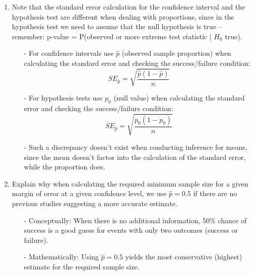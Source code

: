 \documentclass[11pt]{article}
\begin{document}
\begin{enumerate}
\item Note that the standard error calculation for the confidence interval and the hypothesis test are different when dealing with proportions, since in the hypothesis test we need to assume that the null hypothesis is true -- remember: p-value = P(observed or more extreme test statistic $|$ $H_0$ true).
\begin{itemize}
\item[-] For confidence intervals use $\hat{p}$ (observed sample proportion) when calculating the standard error and checking the success/failure condition:
\[ SE_{\hat{p}} = \sqrt{\frac{\hat{p}(1-\hat{p})}{n}} \]
\item[-] For hypothesis tests use $p_0$ (null value) when calculating the standard error and checking the success/failure condition:
\[ SE_{\hat{p}} = \sqrt{\frac{p_0 (1-p_0)}{n}} \]
\item[-] Such a discrepancy doesn't exist when conducting inference for means, since the mean doesn't factor into the calculation of the standard error, while the proportion does.
\end{itemize}

\item Explain why when calculating the required minimum sample size for a given margin of error at a given confidence level, we use $\hat{p} = 0.5$ if there are no previous studies suggesting a more accurate estimate.
\begin{itemize}
\item[-] Conceptually: When there is no additional information, 50\% chance of success is a good guess for events with only two outcomes (success or failure).
\item[-] Mathematically: Using $\hat{p} = 0.5$ yields the most conservative (highest) estimate for the required sample size.
\end{itemize}

\end{enumerate}
\end{document}
